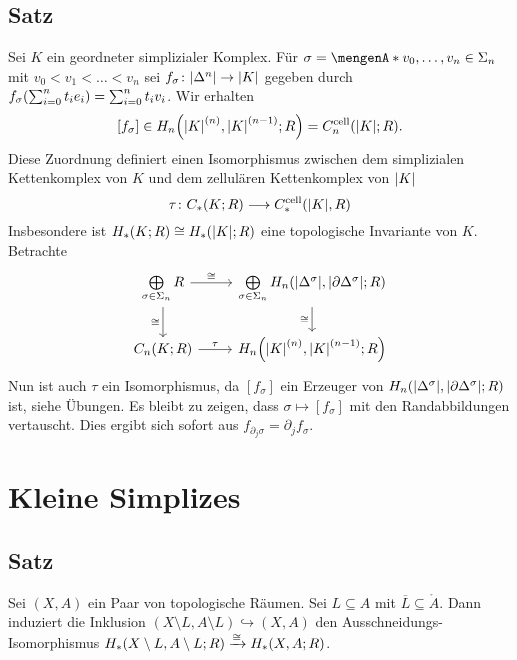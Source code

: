 \subsection{Satz} %
\label{sub:1214}
Sei $K$ ein geordneter simplizialer Komplex. Für $\sigma = \set{v_0, \ldots ,v_n} \in \Sigma_n$ mit $v_0 < v_1 < \ldots  < v_n$ sei 
$f_\sigma \colon \abs*{\Delta^n} \to \abs*{K}$ gegeben durch $f_\sigma \enbrace*{\sum_{i=0}^{n} t_i e_i} = \sum_{i=0}^{n} t_i v_i$. Wir erhalten 
\[
	[f_\sigma] \in H_n \enbrace*{\abs*{K}^{(n)}, \abs*{K}^{(n-1)};R} = C^{\cell}_n \enbrace*{\abs*{K};R}. 
\]
Diese Zuordnung definiert einen Isomorphismus zwischen dem simplizialen Kettenkomplex von $K$ und dem zellulären Kettenkomplex von $\abs*{K}$
\[
	\tau \colon C_*(K;R) \longrightarrow C_*^{\cell}\enbrace*{\abs*{K},R } 
\]
Insbesondere ist $H_*(K;R) \cong H_*(\abs*{K};R)$ eine topologische Invariante von $K$.
Betrachte 
\[
	\begin{tikzcd}
		\bigoplus\limits_{\sigma \in \Sigma_n} R \dar["\cong"'] \rar["\cong"]
		& \bigoplus\limits_{\sigma \in \Sigma_n} H_n \enbrace*{\abs*{\Delta^\sigma}, \abs*{\partial \Delta^\sigma};R} \dar["\cong"'] \\
		C_n(K;R) \rar["\tau"] & H_n \enbrace*{\abs*{K}^{(n)}, \abs*{K}^{(n-1)};R} 
	\end{tikzcd}
\]
Nun ist auch $\tau$ ein Isomorphismus, da $[f_\sigma]$ ein Erzeuger von $H_n \enbrace*{\abs*{\Delta^\sigma}, \abs*{\partial \Delta^\sigma};R}$ ist, siehe Übungen. Es bleibt
zu zeigen, dass $\sigma \mapsto  [f_\sigma]$ mit den Randabbildungen vertauscht. Dies ergibt sich sofort aus $f_{\partial_j \sigma} = \partial_j f_\sigma$.\bewende
\newpage

\section{Kleine Simplizes} %
\label{sec:13}

\subsection[Satz: Ausschneidungs-Isomorphismus]{Satz} %
\label{sub:131}
Sei $(X,A)$ ein Paar von topologische Räumen. Sei $L \subseteq A$ mit $\overline{L} \subseteq \mathring{A}$. Dann induziert die Inklusion 
$(X \setminus L, A \setminus L) \hookrightarrow (X,A)$ den Ausschneidungs-Isomorphismus $H_* \enbrace*{X \setminus L, A \setminus L;R} \xrightarrow{\cong} H_*(X,A;R)$.

